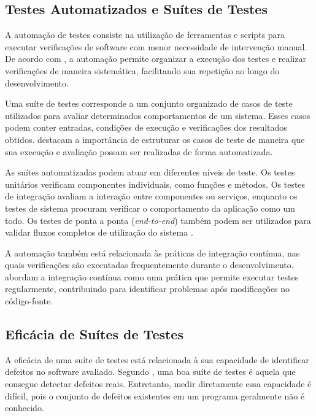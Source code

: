 \subsection{Testes Automatizados e Suítes de Testes}

A automação de testes consiste na utilização de ferramentas e scripts para executar verificações de software com menor necessidade de intervenção manual. De acordo com , a automação permite organizar a execução dos testes e realizar verificações de maneira sistemática, facilitando sua repetição ao longo do desenvolvimento.

Uma suíte de testes corresponde a um conjunto organizado de casos de teste utilizados para avaliar determinados comportamentos de um sistema. Esses casos podem conter entradas, condições de execução e verificações dos resultados obtidos.  destacam a importância de estruturar os casos de teste de maneira que sua execução e avaliação possam ser realizadas de forma automatizada.

As suítes automatizadas podem atuar em diferentes níveis de teste. Os testes unitários verificam componentes individuais, como funções e métodos. Os testes de integração avaliam a interação entre componentes ou serviços, enquanto os testes de sistema procuram verificar o comportamento da aplicação como um todo. Os testes de ponta a ponta (\textit{end-to-end}) também podem ser utilizados para validar fluxos completos de utilização do sistema \cite{ammann2016}.

A automação também está relacionada às práticas de integração contínua, nas quais verificações são executadas frequentemente durante o desenvolvimento.  abordam a integração contínua como uma prática que permite executar testes regularmente, contribuindo para identificar problemas após modificações no código-fonte.

\subsection{Eficácia de Suítes de Testes}

A eficácia de uma suíte de testes está relacionada à sua capacidade de identificar defeitos no software avaliado. Segundo , uma boa suíte de testes é aquela que consegue detectar defeitos reais. Entretanto, medir diretamente essa capacidade é difícil, pois o conjunto de defeitos existentes em um programa geralmente não é conhecido.

